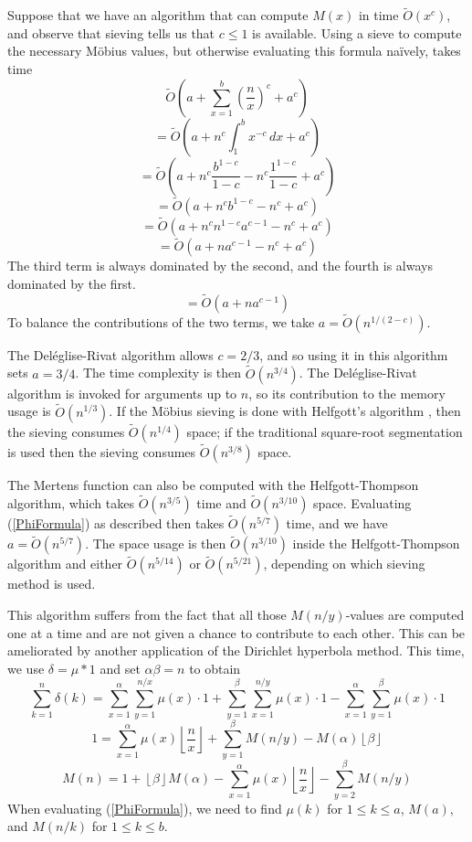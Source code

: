 \documentclass[12pt]{article}
\newcommand{\eqn}[1]{\begin{displaymath} #1 \end{displaymath}}
\newcommand{\neqn}[1]{\begin{equation} #1 \end{equation}}
\newcommand{\floor}[1]{{\left\lfloor #1 \right\rfloor}}
\newcommand{\integral}[4]{\displaystyle\int_{#3}^{#4} \! #1 \, d#2}
\newcommand{\floordiv}[2]{\floor{\frac{#1}{#2}}}
\begin{document}
Suppose that we have an algorithm that can compute $M(x)$ in time $\widetilde{O}(x^c)$, and observe that sieving tells us that $c\leq1$ is available.  Using a sieve to compute the necessary M\"obius values, but otherwise evaluating this formula na\"{i}vely, takes time
\eqn{\widetilde{O}\left( a + \sum_{x=1}^b \left(\frac{n}{x}\right)^c + a^c \right)}
\eqn{=\widetilde{O}\left( a + n^c \integral{x^{-c}}{x}{1}{b} + a^c \right)}
\eqn{=\widetilde{O}\left( a + n^c\frac{b^{1-c}}{1-c} - n^c\frac{1^{1-c}}{1-c} + a^c \right)}
\eqn{=\widetilde{O}\left( a + n^c b^{1-c} - n^c + a^c \right)}
\eqn{=\widetilde{O}\left( a + n^c n^{1-c} a^{c-1} - n^c + a^c \right)}
\eqn{=\widetilde{O}\left( a + n a^{c-1} - n^c + a^c \right)}
The third term is always dominated by the second, and the fourth is always dominated by the first.
\eqn{=\widetilde{O}\left( a + n a^{c-1} \right)}
To balance the contributions of the two terms, we take $a = \widetilde{O}(n^{1/(2-c)})$.

The Del\'{e}glise-Rivat algorithm \cite{DR1996} allows $c=2/3$, and so using it in this algorithm sets $a=3/4$.  The time complexity is then $\widetilde{O}(n^{3/4})$. 
 The Del\'{e}glise-Rivat algorithm is invoked for arguments up to $n$, so its contribution to the memory usage is $\widetilde{O}(n^{1/3})$.  If the M\"{o}bius sieving is done with Helfgott's algorithm \cite{Helfgott2020}, then the sieving consumes $\widetilde{O}(n^{1/4})$ space; if the traditional square-root segmentation is used then the sieving consumes $\widetilde{O}(n^{3/8})$ space.

The Mertens function can also be computed with the Helfgott-Thompson algorithm, which takes $\widetilde{O}(n^{3/5})$ time and $\widetilde{O}(n^{3/10})$ space.  Evaluating (\ref{PhiFormula}) as described then takes $\widetilde{O}(n^{5/7})$ time, and we have $a = \widetilde{O}(n^{5/7})$.  The space usage is then $\widetilde{O}(n^{3/10})$ inside the Helfgott-Thompson algorithm and either $\widetilde{O}(n^{5/14})$ or $\widetilde{O}(n^{5/21})$, depending on which sieving method is used.

This algorithm suffers from the fact that all those $M(n/y)$-values are computed one at a time and are not given a chance to contribute to each other.  This can be ameliorated by another application of the Dirichlet hyperbola method.  This time, we use $\delta = \mu * 1$ and set $\alpha\beta=n$ to obtain
\eqn{\sum_{k=1}^n \delta(k) = \sum_{x=1}^{\alpha}\sum_{y=1}^{n/x} \mu(x) \cdot 1 + \sum_{y=1}^{\beta}\sum_{x=1}^{n/y} \mu(x) \cdot 1 - \sum_{x=1}^{\alpha}\sum_{y=1}^{\beta} \mu(x) \cdot 1}
\eqn{1 = \sum_{x=1}^{\alpha} \mu(x) \floordiv{n}{x} + \sum_{y=1}^{\beta} M(n/y) - M(\alpha) \floor{\beta}}
\neqn{M(n) = 1 + \floor{\beta} M(\alpha) - \sum_{x=1}^{\alpha} \mu(x) \floordiv{n}{x} - \sum_{y=2}^{\beta} M(n/y) \label{MertensRecursion}}
When evaluating (\ref{PhiFormula}), we need to find $\mu(k)$ for $1 \leq k \leq a$, $M(a)$, and $M(n/k)$ for $1 \leq k \leq b$.
\end{document}
